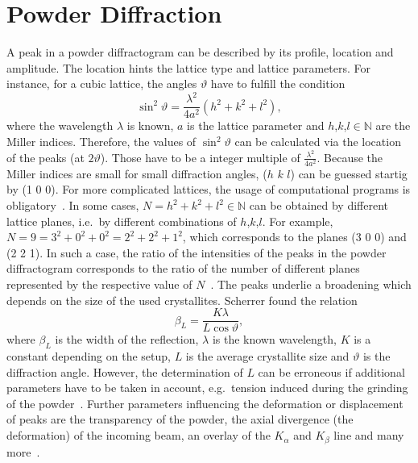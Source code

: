  
\section{Powder Diffraction}\label{sec:Q7}

A peak in a powder diffractogram can be described by its profile, location and amplitude. The location hints the lattice type and lattice parameters. For instance, for a cubic lattice, the angles $\vartheta$ have to fulfill the condition 
\begin{equation}
    \sin^2\vartheta = \frac{\lambda^2}{4a^2}(h^2+k^2+l^2),
\end{equation}
where the wavelength $\lambda$ is known, $a$ is the lattice parameter and $h$,$k$,$l \in \mathbb{N}$ are the Miller indices. Therefore, the values of $\sin^2\vartheta$ can be calculated via the location of the peaks (at $2\vartheta$). Those have to be a integer multiple of $\frac{\lambda^2}{4a^2}$. Because the Miller indices are small for small diffraction angles, ($h$ $k$ $l$) can be guessed startig by (1 0 0). For more complicated lattices, the usage of computational programs is obligatory~\cite{Bohm.2021}. In some cases, $N=h^2+k^2+l^2 \in \mathbb{N}$ can be obtained by different lattice planes, i.e.~by different combinations of $h$,$k$,$l$. For example, $N=9=3^2+0^2+0^2=2^2+2^2+1^2$, which corresponds to the planes (3 0 0) and (2 2 1). In such a case, the ratio of the intensities of the peaks in the powder diffractogram corresponds to the ratio of the number of different planes represented by the respective value of $N$~\cite{Bohm.2021}. The peaks underlie a broadening which depends on the size of the used crystallites. Scherrer found the relation
\begin{equation}
    \beta_L = \frac{K\lambda}{L\cos\vartheta},
\end{equation}
where $\beta_L$ is the width of the reflection, $\lambda$ is the known wavelength, $K$ is a constant depending on the setup, $L$ is the average crystallite size and $\vartheta$ is the diffraction angle. However, the determination of $L$ can be erroneous if additional parameters have to be taken in account, e.g.~tension induced during the grinding of the powder~\cite{Bohm.2021}. Further parameters influencing the deformation or displacement of peaks are the transparency of the powder, the axial divergence (the deformation) of the incoming beam, an overlay of the $K_{\alpha}$ and $K_{\beta}$ line and many more~\cite{Allmann.2003}. \par 
